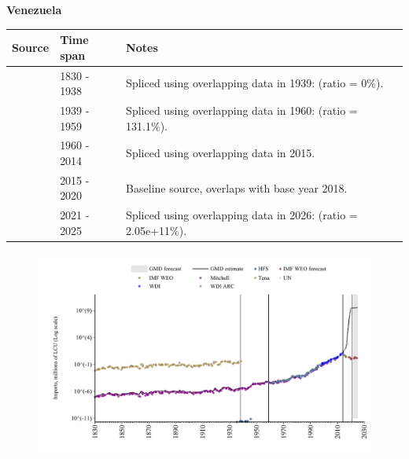 \documentclass[12pt,a4paper,landscape]{article}
\begin{document}
\begin{adjustbox}{max totalsize={\paperwidth}{\paperheight},center}
\begin{minipage}[t][\textheight][t]{\textwidth}
\vspace*{0.5cm}
{}
\begin{center}
{\Large\bfseries Venezuela}
\end{center}
\vspace{0.5cm}
\begin{table}[H]
\centering
\small
\begin{tabular}{|l|l|l|}
\hline
\textbf{Source} & \textbf{Time span} & \textbf{Notes} \\
\hline
\rowcolor{white}\cite{Tena}& 1830 - 1938 &Spliced using overlapping data in 1939: (ratio = 0\%).\\
\rowcolor{lightgray}\cite{Mitchell}& 1939 - 1959 &Spliced using overlapping data in 1960: (ratio = 131.1\%).\\
\rowcolor{white}\cite{WDI}& 1960 - 2014 &Spliced using overlapping data in 2015.\\
\rowcolor{lightgray}\cite{UN}& 2015 - 2020 &Baseline source, overlaps with base year 2018.\\
\rowcolor{white}\cite{IMF_WEO_forecast}& 2021 - 2025 &Spliced using overlapping data in 2026: (ratio = 2.05e+11\%).\\
\hline
\end{tabular}
\end{table}
\begin{figure}[H]
\centering
\includegraphics[width=\textwidth,height=0.6\textheight,keepaspectratio]{graphs/VEN_imports.pdf}
\end{figure}
\end{minipage}
\end{adjustbox}
\end{document}
